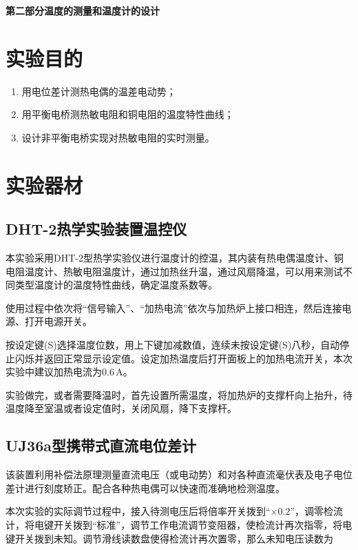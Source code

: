 \documentclass[12pt]{article}
\begin{document}
\newpage

\begin{center}
    \Large \textbf{第二部分\quad 温度的测量和温度计的设计}
\end{center}

\setcounter{section}{0}
\section{实验目的}
\begin{enumerate}
    \item 用电位差计测热电偶的温差电动势；
    \item 用平衡电桥测热敏电阻和铜电阻的温度特性曲线；
    \item 设计非平衡电桥实现对热敏电阻的实时测量。
\end{enumerate}

\section{实验器材}
\subsection{DHT-2热学实验装置温控仪}
本实验采用DHT-2型热学实验仪进行温度计的控温，其内装有热电偶温度计、铜电阻温度计、热敏电阻温度计，通过加热丝升温，通过风扇降温，可以用来测试不同类型温度计的温度特性曲线，确定温度系数等。
	
使用过程中依次将“信号输入”、“加热电流”依次与加热炉上接口相连，然后连接电源、打开电源开关。
	
按设定键(S)选择温度位数，用上下键加减数值，连续未按设定键(S)八秒，自动停止闪烁并返回正常显示设定值。设定加热温度后打开面板上的加热电流开关，本次实验中建议加热电流为$ 0.6\,\mathrm A $。

实验做完，或者需要降温时，首先设置所需温度，将加热炉的支撑杆向上抬升，待温度降至室温或者设定值时，关闭风扇，降下支撑杆。

\subsection{UJ36a型携带式直流电位差计}
该装置利用补偿法原理测量直流电压（或电动势）和对各种直流毫伏表及电子电位差计进行刻度矫正。配合各种热电偶可以快速而准确地检测温度。
	
本次实验的实际调节过程中，接入待测电压后将倍率开关拨到“$ \times 0.2 $”，调零检流计，将电键开关拨到“标准”，调节工作电流调节变阻器，使检流计再次指零，将电键开关拨到未知。调节滑线读数盘使得检流计再次置零，那么未知电压读数为
\end{document}
